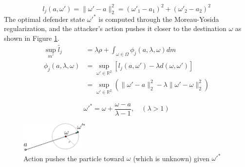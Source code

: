 \documentclass{article}
\begin{document}
\begin{equation}
l_j(a,\omega') = \| \omega' - a \|_2^2 = (\omega'_1 - a_1)^2 + (\omega'_2 - a_2)^2
\end{equation}
The optimal defender state $\omega'^*$ is computed through the Moreau-Yosida regularization, and the attacker's action pushes it closer to the destination $\omega$ as shown in Figure \ref{fig:action}.
\begin{equation}
\begin{aligned}
\sup_{m'} \tilde{l_j} &= \lambda \rho + \int_{\omega \in \Omega} \phi_j(a,\lambda,\omega) dm \\
\phi_j(a,\lambda,\omega) &= \sup_{\omega' \in \mathbb{R}^2}[l_j(a,\omega') - \lambda d(\omega,\omega')] \\
&= \sup_{\omega' \in \mathbb{R}^2} (\| \omega'-a \|_2^2 - \lambda \| \omega'-\omega \|_2^2)
\end{aligned}
\end{equation}

\begin{equation}
\omega'^* = \omega + \frac{\omega - a}{\lambda - 1}, \quad (\lambda > 1)
\end{equation}

\begin{figure}[htb]
\centering
\includegraphics[width=0.3\textwidth]{FIGDRG/action}
\caption{Action pushes the particle toward $\omega$ (which is unknown) given $\omega'^*$}
\label{fig:action}
\end{figure}
\end{document}
